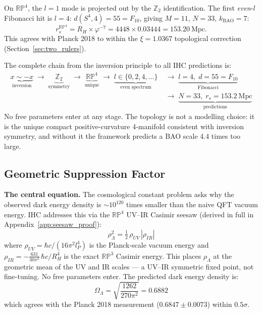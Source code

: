 \documentclass[12pt,a4paper]{article}
\begin{document}
On $\mathbb{RP}^4$, the $l = 1$ mode is projected out by the $\mathbb{Z}_2$
identification. The first \emph{even}-$l$ Fibonacci hit is $l = 4$:
$d(S^4, 4) = 55 = F_{10}$, giving $M = 11$, $N = 33$, $k_\mathrm{BAO} = 7$:
\begin{equation}
  r_s^{\mathbb{RP}^4} = R_H \times \varphi^{-7} = 4448 \times 0.03444 = 153.20~\mathrm{Mpc}.
  \label{eq:rp4_prediction_rs}
\end{equation}
This agrees with Planck 2018 to within the $\xi = 1.0367$ topological correction
(Section~\ref{sec:two_rulers}).

The complete chain from the inversion principle to all IHC predictions is:
\begin{align}
  \underbrace{x \sim -x}_{\text{inversion}} \;\longrightarrow\;
  \underbrace{\mathbb{Z}_2}_{\text{symmetry}} \;\longrightarrow\;
  \underbrace{\mathbb{RP}^4}_{\text{unique}} \;\longrightarrow\;
  \underbrace{l \in \{0,2,4,\ldots\}}_{\text{even spectrum}} &\;\longrightarrow\;
  \underbrace{l=4,\; d=55=F_{10}}_{\text{Fibonacci}} \nonumber\\
  &\;\longrightarrow\;
  \underbrace{N=33,\; r_s = 153.2~\mathrm{Mpc}}_{\text{predictions}}
  \label{eq:derivation_chain}
\end{align}
No free parameters enter at any stage. The topology is not a modelling
choice: it is the unique compact positive-curvature 4-manifold consistent with
inversion symmetry, and without it the framework predicts a BAO scale 4.4 times
too large.

\subsection{Geometric Suppression Factor}
\label{sec:beta}

\textbf{The central equation.} The cosmological constant problem asks why the
observed dark energy density is $\sim\!10^{120}$ times smaller than the naive QFT
vacuum energy. IHC addresses this via the $\mathbb{RP}^4$ UV--IR Casimir seesaw
(derived in full in Appendix~\ref{app:seesaw_proof}):
\begin{equation}
  \boxed{\rho_\Lambda^2 = \tfrac{1}{2}\,\rho_{UV}\,|\rho_{IR}|}
  \label{eq:central}
\end{equation}
where $\rho_{UV} = \hbar c/(16\pi^2 l_P^4)$ is the Planck-scale vacuum energy and
$\rho_{IR} = -\tfrac{631}{30\pi^2}\,\hbar c/R_H^4$ is the exact $\mathbb{RP}^3$ Casimir
energy. This places $\rho_\Lambda$ at the geometric mean of the UV and IR scales
--- a UV--IR symmetric fixed point, not fine-tuning. No free parameters enter.
The predicted dark energy density is:
\begin{equation}
  \Omega_\Lambda = \sqrt{\frac{1262}{270\pi^2}} = 0.6882
  \label{eq:OmL_seesaw}
\end{equation}
which agrees with the Planck 2018 measurement ($0.6847 \pm 0.0073$) within $0.5\sigma$.
\end{document}
